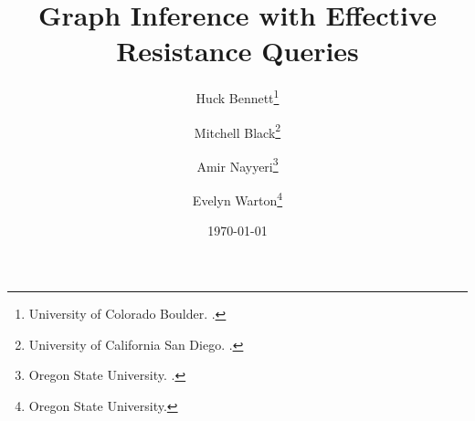 \documentclass{article}
\title{Graph Inference with Effective Resistance Queries}
\author{Huck Bennett\thanks{University of Colorado Boulder. \email{huck.bennett@colorado.edu}.} \and Mitchell Black\thanks{University of California San Diego. \email{m4black@ucsd.edu}.} \and Amir Nayyeri\thanks{Oregon State University. \email{Amir.Nayyeri@oregonstate.edu}.} \and Evelyn Warton\thanks{Oregon State University. \email{wartone@oregonstate.edu}}}
\date{\today}
\begin{document}
\maketitle
\listoffixmes







\printbibliography
\end{document}
